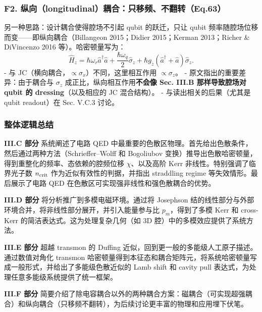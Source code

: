 \documentclass[12pt,a4paper,oneside]{ctexbook}
\begin{document}
\subsubsection{\texorpdfstring{\textbf{F2.
纵向（longitudinal）耦合：只移频、不翻转（Eq.63）}}{F2. 纵向（longitudinal）耦合：只移频、不翻转（Eq.63）}}\label{f2.-ux7eb5ux5411longitudinalux8026ux5408ux53eaux79fbux9891ux4e0dux7ffbux8f6ceq.63}

另一种思路：设计耦合使得腔场不引起 qubit 的跃迁，只让 qubit
频率随腔场位移而变------即纵向耦合（Billangeon 2015；Didier 2015；Kerman
2013；Richer \& DiVincenzo 2016 等）。哈密顿量写为： \[
\hat H_z=
\hbar\omega_r\hat a^\dagger\hat a
+\frac{\hbar\omega_q}{2}\hat\sigma_z
+\hbar g_z(\hat a^\dagger+\hat a)\hat\sigma_z.
\tag{63}
\] - 与 JC（横向耦合，\(\propto \sigma_x\)）不同，这里相互作用
\(\propto \sigma_z\)。 - 原文指出的重要差异：由于耦合与 \(\sigma_z\)
成正比，纵向相互作用\textbf{不会像 Sec. III.B 那样导致腔场对 qubit 的
dressing}（以及相应的 JC 混合结构）。 - 与读出相关的后果（尤其是 qubit
readout）在 Sec. V.C.3 讨论。


\subsubsection{\texorpdfstring{\textbf{整体逻辑总结}}{整体逻辑总结}}\label{ux6574ux4f53ux903bux8f91ux603bux7ed3-1}

\textbf{III.C 部分} 系统阐述了电路 QED
中最重要的色散区物理。首先给出色散条件，然后通过两种方法（Schrieffer--Wolff
和 Bogoliubov
变换）推导出色散哈密顿量，得到重整化的频率、态依赖的腔频位移
\(\chi\)、以及高阶 Kerr 非线性。特别强调了临界光子数 \(n_{\rm crit}\)
作为近似有效性的判据，并指出 straddling regime
等失效情形。最后展示了电路 QED
在色散区可实现强非线性和强色散耦合的优势。

\textbf{III.D 部分} 将分析推广到多模电磁环境。通过将 Josephson
结的线性部分与外部环境合并，将非线性部分展开，并引入能量参与比
\(p_m\)，得到了多模 Kerr 和 cross-Kerr
的简洁表达式。这为处理复杂几何（如 3D 腔）中的多模效应提供了系统方法。

\textbf{III.E 部分} 超越 transmon 的 Duffing
近似，回到更一般的多能级人工原子描述。通过数值对角化 transmon
哈密顿量得到本征态和耦合矩阵元，将系统哈密顿量写成一般形式，并给出了多能级色散近似的
Lamb shift 和 cavity pull 表达式，为处理任意多能级系统提供了统一框架。

\textbf{III.F 部分}
简要介绍了除电容耦合以外的两种耦合方案：磁耦合（可实现超强耦合）和纵向耦合（只移频不翻转），为后续讨论更丰富的物理和应用埋下伏笔。
\end{document}
